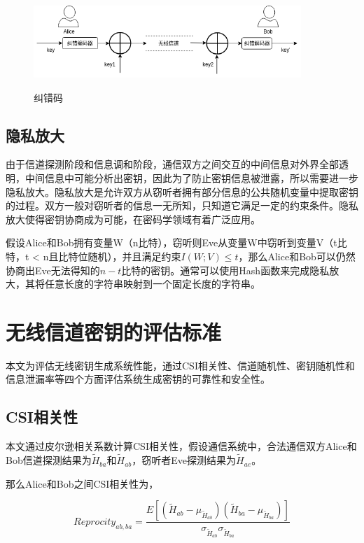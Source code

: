 \documentclass[master]{seuthesis} %
\begin{document}
\begin{Main}
\begin{figure}
    \centering
    \includegraphics[width=0.9\textwidth]{images/error_correcting_code}
    \caption{纠错码}{} %
    \label{error_correcting_code}
\end{figure}

\subsection{隐私放大}

由于信道探测阶段和信息调和阶段，通信双方之间交互的中间信息对外界全部透明，中间信息中可能分析出密钥，因此为了防止密钥信息被泄露，所以需要进一步隐私放大。隐私放大是允许双方从窃听者拥有部分信息的公共随机变量中提取密钥的过程。双方一般对窃听者的信息一无所知，只知道它满足一定的约束条件。隐私放大使得密钥协商成为可能，在密码学领域有着广泛应用\cite{vernam1926cipher}。

假设Alice和Bob拥有变量W（n比特），窃听则Eve从变量W中窃听到变量V（t比特，t < n且比特位随机），并且满足约束$ I(W;V) \leq t $，那么Alice和Bob可以仍然协商出Eve无法得知的$n-t$比特的密钥\cite{bennett1988privacy}。通常可以使用Hash函数来完成隐私放大\cite{wegman1981new}，其将任意长度的字符串映射到一个固定长度的字符串。

\section{无线信道密钥的评估标准}

本文为评估无线密钥生成系统性能，通过CSI相关性、信道随机性、密钥随机性和信息泄漏率等四个方面评估系统生成密钥的可靠性和安全性。

\subsection{CSI相关性}

本文通过皮尔逊相关系数计算CSI相关性，假设通信系统中，合法通信双方Alice和Bob信道探测结果为$\tilde{H}_{ba}$和$\tilde{H}_{ab}$，窃听者Eve探测结果为$\tilde{H}_{ae}$。

那么Alice和Bob之间CSI相关性为，

\begin{equation}\label{equation_corr_ab}
    Reprocity_{ab, ba} = \frac{E[(\tilde{H}_{ab}-\mu_{\tilde{H}_{ab}})(\tilde{H}_{ba}-\mu_{\tilde{H}_{ba}})]}{\sigma_{\tilde{H}_{ab}}\sigma_{\tilde{H}_{ba}}}
\end{equation}


\end{Main}
\end{document}
